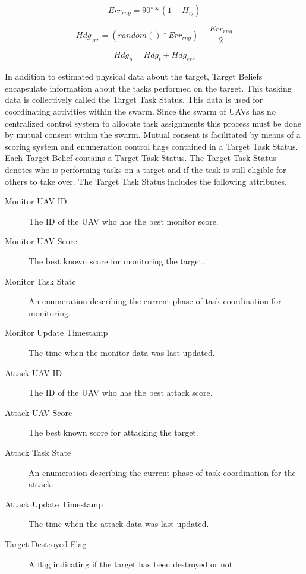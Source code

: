 \begin{equation}
\label{eq:hdg_err_rng}
Err_{rng} = 90^{\circ} * (1 - H_{ij})
\end{equation}

\begin{equation}
\label{eq:rand_hdg_err}
Hdg_{err} = (random() * Err_{rng}) - \frac{Err_{rng}}{2}
\end{equation}

\begin{equation}
Hdg_{p} = Hdg_{t} + Hdg_{err}
\end{equation}

In addition to estimated physical data about the target, Target Beliefs encapsulate information about the tasks performed on the target.  This tasking data is collectively called the Target Task Status.  This data is used for coordinating activities within the swarm.  Since the swarm of UAVs has no centralized control system to allocate task assignments this process must be done by mutual consent within the swarm.  Mutual consent is facilitated by means of a scoring system and enumeration control flags contained in a Target Task Status.  Each Target Belief contains a Target Task Status.  The Target Task Status denotes who is performing tasks on a target and if the task is still eligible for others to take over. The Target Task Status includes the following attributes.

\begin{description}
	\item [Monitor UAV ID] The ID of the UAV who has the best monitor score.
	\item [Monitor UAV Score] The best known score for monitoring the target.
	\item [Monitor Task State] An enumeration describing the current phase of task coordination for monitoring.
	\item [Monitor Update Timestamp] The time when the monitor data was last updated.
	\item [Attack UAV ID] The ID of the UAV who has the best attack score.
	\item [Attack UAV Score] The best known score for attacking the target.
	\item [Attack Task State] An enumeration describing the current phase of task coordination for the attack.
	\item [Attack Update Timestamp] The time when the attack data was last updated.
	\item [Target Destroyed Flag] A flag indicating if the target has been destroyed or not.
\end{description}

